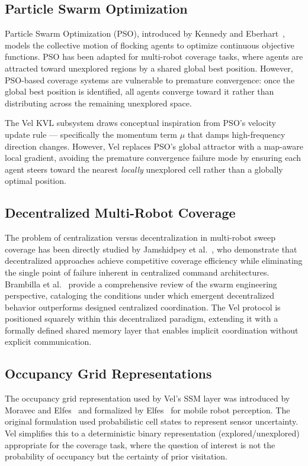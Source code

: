 \documentclass[journal,compsoc]{IEEEtran}
\begin{document}
\subsection{Particle Swarm Optimization}

Particle Swarm Optimization (PSO), introduced by Kennedy and
Eberhart~\cite{kennedy1995}, models the collective motion of flocking agents to
optimize continuous objective functions. PSO has been adapted for multi-robot coverage
tasks, where agents are attracted toward unexplored regions by a shared global best
position. However, PSO-based coverage systems are vulnerable to premature convergence:
once the global best position is identified, all agents converge toward it rather than
distributing across the remaining unexplored space.

The Vel KVL subsystem draws conceptual inspiration from PSO's velocity update rule ---
specifically the momentum term $\mu$ that damps high-frequency direction changes. However,
Vel replaces PSO's global attractor with a map-aware local gradient, avoiding the
premature convergence failure mode by ensuring each agent steers toward the nearest
\emph{locally} unexplored cell rather than a globally optimal position.

\subsection{Decentralized Multi-Robot Coverage}

The problem of centralization versus decentralization in multi-robot sweep coverage has
been directly studied by Jamshidpey et al.~\cite{jamshidpey2024}, who demonstrate that
decentralized approaches achieve competitive coverage efficiency while eliminating the
single point of failure inherent in centralized command architectures. Brambilla et
al.~\cite{brambilla2013} provide a comprehensive review of the swarm engineering
perspective, cataloging the conditions under which emergent decentralized behavior
outperforms designed centralized coordination. The Vel protocol is positioned squarely
within this decentralized paradigm, extending it with a formally defined shared memory
layer that enables implicit coordination without explicit communication.

\subsection{Occupancy Grid Representations}

The occupancy grid representation used by Vel's SSM layer was introduced by Moravec and
Elfes~\cite{moravec1985} and formalized by Elfes~\cite{elfes1989} for mobile robot
perception. The original formulation used probabilistic cell states to represent sensor
uncertainty. Vel simplifies this to a deterministic binary representation (explored/unexplored)
appropriate for the coverage task, where the question of interest is not the probability
of occupancy but the certainty of prior visitation.
\end{document}
